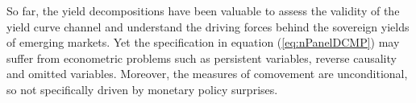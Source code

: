{So far, the yield decompositions have been valuable to assess the validity of the yield curve channel and understand the driving forces behind the sovereign yields of emerging markets.
Yet the specification in equation (\ref{eq:nPanelDCMP}) may suffer from econometric problems such as persistent variables, reverse causality and omitted variables.
Moreover, the measures of comovement are unconditional, so not specifically driven by monetary policy surprises. %


%



}
